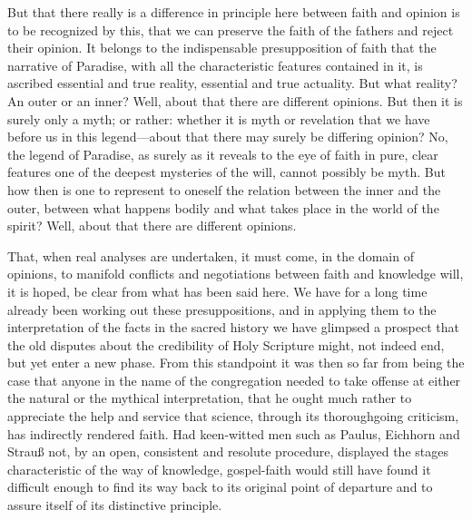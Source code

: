 \documentclass[12pt]{book}
\newcommand{\opage}[1]{\marginnote{\footnotesize\textit{[#1]}}}
\begin{document}
But that there really is a difference in principle here between faith and opinion is to be recognized by this, that we can preserve the faith of the fathers and reject their opinion. It belongs to the indispensable presupposition of faith that the narrative of Paradise, with all the characteristic features contained in it, is ascribed essential and true reality, essential and true actuality. But what reality? An outer or an inner? Well, about that there are different opinions. But then it is surely only a myth; or rather: whether it is myth or revelation that we have before us in this legend---about that there may surely be differing opinion? No, the legend of Paradise, as surely as it reveals to the eye of faith in pure, clear features one of the deepest mysteries of the will, cannot possibly be myth. But how then is one to represent to oneself the relation between the inner
\opage{64}\setcounter{footnote}{0}%
and the outer, between what happens bodily and what takes place in the world of the spirit? Well, about that there are different opinions.

That, when real analyses are undertaken, it must come, in the domain of opinions, to manifold conflicts and negotiations between faith and knowledge will, it is hoped, be clear from what has been said here. We have for a long time already been working out these presuppositions, and in applying them to the interpretation of the facts in the sacred history we have glimpsed a prospect that the old disputes about the credibility of Holy Scripture might, not indeed end, but yet enter a new phase. From this standpoint it was then so far from being the case that anyone in the name of the congregation needed to take offense at either the natural or the mythical interpretation, that he ought much rather to appreciate the help and service that science, through its thoroughgoing criticism, has indirectly rendered faith. Had keen-witted men such as Paulus, Eichhorn and Strauß not, by an open, consistent and resolute procedure, displayed the stages characteristic of the way of knowledge, gospel-faith would still have found it difficult enough to find its way back to its original point of departure and to assure itself of its distinctive principle.
\end{document}
